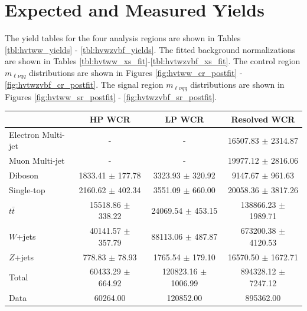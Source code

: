 \section{Expected and Measured Yields}
The yield tables for the four analysis regions are shown in Tables \ref{tbl:hvtww_yields} - \ref{tbl:hvwzvbf_yields}. The fitted background normalizations are shown in Tables \ref{tbl:hvtww_xs_fit}-\ref{tbl:hvtwzvbf_xs_fit}. The control region $m_{\ell\nu qq}$ distributions are shown in Figures \ref{fig:hvtww_cr_postfit} - \ref{fig:hvtwzvbf_cr_postfit}. The signal region $m_{\ell\nu qq}$ distributions are shown in Figures \ref{fig:hvtww_sr_postfit} - \ref{fig:hvtwzvbf_sr_postfit}.
\begin{table}
\begin{tabular}{|l|c|c|c|}
\hline
	  &	 HP WCR &	 LP WCR &	Resolved WCR \\\hline 
	Electron Multi-jet &	- &	- &	16507.83 $\pm$ 2314.87 \\\hline 
	Muon Multi-jet &	- &	- &	19977.12 $\pm$ 2816.06 \\\hline 
	Diboson &	1833.41 $\pm$ 177.78 &	3323.93 $\pm$ 320.92 &	9147.67 $\pm$ 961.63 \\\hline 
	Single-top &	2160.62 $\pm$ 402.34 &	3551.09 $\pm$ 660.00 &	20058.36 $\pm$ 3817.26 \\\hline 
	$t\bar{t}$ &	15518.86 $\pm$ 338.22 &	24069.54 $\pm$ 453.15 &	138866.23 $\pm$ 1989.71 \\\hline 
	$W$+jets &	40141.57 $\pm$ 357.79 &	88113.06 $\pm$ 487.87 &	673200.38 $\pm$ 4120.53 \\\hline 
	$Z$+jets &	778.83 $\pm$ 78.93 &	1765.54 $\pm$ 179.10 &	16570.50 $\pm$ 1672.71 \\\hline 
	Total &	60433.29 $\pm$ 664.92 &	120823.16 $\pm$ 1006.99 &	894328.12 $\pm$ 7247.12 \\\hline 
	Data &	60264.00 &	120852.00 &	895362.00 \\\hline 
\end{tabular}


 

\end{table}
